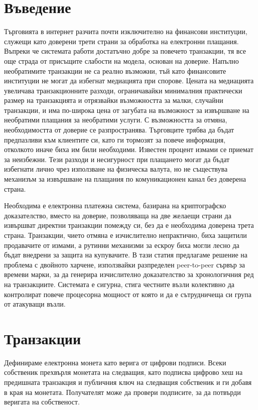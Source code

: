 \documentclass[11pt,a4paper]{article}
\begin{document}
\section{Въведение}
Търговията в интернет разчита почти изключително на финансови институции, служещи като доверени трети страни за обработка на електронни плащания. Въпреки че системата работи достатъчно добре за повечето транзакции, тя все още страда от присъщите слабости на модела, основан на доверие. Напълно необратимите транзакции не са реално възможни, тъй като финансовите институции не могат да избегнат медиацията при спорове. Цената на медиацията увеличава транзакционните разходи, ограничавайки минималния практически размер на транзакцията и отрязвайки възможността за малки, случайни транзакции, и има по-широка цена от загубата на възможност за извършване на необратими плащания за необратими услуги. С възможността за отмяна, необходимостта от доверие се разпространява. Търговците трябва да бъдат предпазливи към клиентите си, като ги тормозят за повече информация, отколкото иначе биха им били необходими. Известен процент измами се приемат за неизбежни. Тези разходи и несигурност при плащането могат да бъдат избегнати лично чрез използване на физическа валута, но не съществува механизъм за извършване на плащания по комуникационен канал без доверена страна.

Необходима е електронна платежна система, базирана на криптографско доказателство, вместо на доверие, позволяваща на две желаещи страни да извършват директни транзакции помежду си, без да е необходима доверена трета страна. Транзакции, чието отмяна е изчислително непрактично, биха защитили продавачите от измами, а рутинни механизми за ескроу биха могли лесно да бъдат внедрени за защита на купувачите. В тази статия предлагаме решение на проблема с двойното харчене, използвайки разпределен peer-to-peer сървър за времеви марки, за да генерира изчислително доказателство за хронологичния ред на транзакциите. Системата е сигурна, стига честните възли колективно да контролират повече процесорна мощност от която и да е сътрудничеща си група от атакуващи възли.

\section{Транзакции}
Дефинираме електронна монета като верига от цифрови подписи. Всеки собственик прехвърля монетата на следващия, като подписва цифрово хеш на предишната транзакция и публичния ключ на следващия собственик и ги добавя в края на монетата. Получателят може да провери подписите, за да потвърди веригата на собственост.
\end{document}
